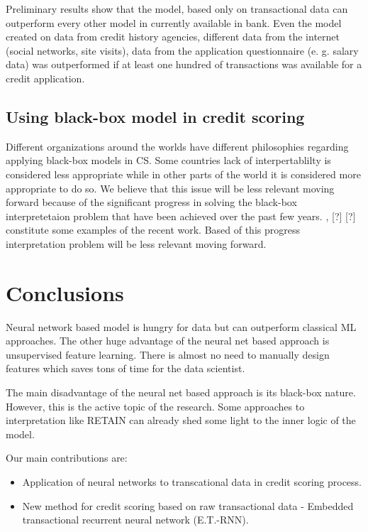 \documentclass[sigconf]{acmart}
\begin{document}
Preliminary results show that the model, based only on transactional data can outperform every other model in currently available in bank. Even the model created on data from credit history agencies, different data from the internet (social networks, site visits), data from the application questionnaire (e. g. salary data) was outperformed if at least one hundred of transactions was available for a credit application.

\subsection{Using black-box model in credit scoring}

Different organizations around the worlds have different philosophies regarding applying black-box models in CS. Some countries lack of interpertablilty is considered less appropriate while in other parts of the world it is considered more appropriate to do so. We believe that this issue will be less relevant moving forward because of the significant progress in solving the black-box interpretetaion problem that have been achieved over the past few years. \cite{DBLP:journals/corr/ChoiBSSS16}, [?] [?] constitute some examples of the recent work. Based of this progress interpretation problem will be less relevant moving forward.

\section{Conclusions}

Neural network based model is hungry for data but can outperform classical ML approaches. The other huge advantage of the neural net based approach is unsupervised feature learning. There is almost no need to manually design features which saves tons of time for the data scientist.

The main disadvantage of the neural net based approach is its black-box nature. However, this is the active topic of the research. Some approaches to interpretation like RETAIN can already shed some light to the inner logic of the model.

Our main contributions are:
\begin{itemize}
\item{Application of neural networks to transcational data in credit scoring process.}
\item{New method for credit scoring based on raw transactional data - Embedded transactional recurrent neural network (E.T.-RNN).}
\end{itemize}
\end{document}
